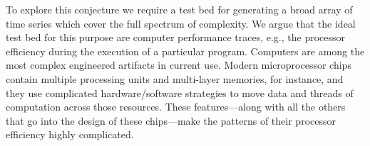 
To explore this conjecture we require a test bed for generating a broad array of time series which cover the full spectrum of complexity. We argue that the ideal test bed for this purpose are computer performance traces, e.g., the processor efficiency during the execution of a particular program. Computers are among the most complex engineered artifacts in current
use.  Modern microprocessor chips contain multiple processing units
and multi-layer memories, for instance, and they use complicated
hardware/software strategies to move data and threads of computation
across those resources.  These features---along with all the others
that go into the design of these chips---make the patterns of their
processor efficiency highly complicated.


